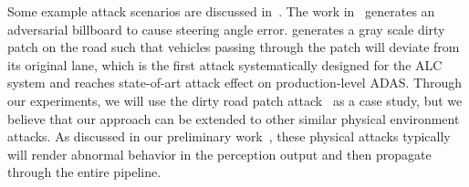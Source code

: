 Some example attack scenarios are discussed in~\cite{zhou2020deep,sato2020hold}. The work in~\cite{zhou2020deep}  generates an adversarial billboard to cause steering angle error. \cite{sato2020hold} generates a gray scale dirty patch on the road such that vehicles passing through the patch will deviate from its original lane, which is the first attack systematically designed for the ALC system and reaches state-of-art attack effect on production-level ADAS. Through our experiments, we will use the dirty road patch attack~\cite{sato2020hold} as a case study, but we believe that our approach can be extended to other similar physical environment attacks. As discussed in our preliminary work~\cite{liang2021endtoend}, these physical attacks typically will render abnormal behavior in the perception output and then propagate through the entire pipeline.

